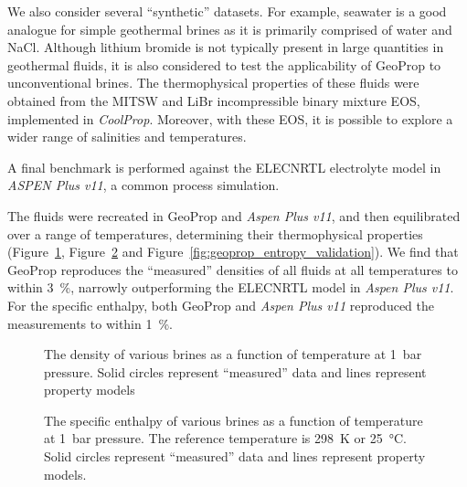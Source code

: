     We also consider several “synthetic” datasets. For example, seawater is a good analogue for simple geothermal brines as it is primarily comprised of water and NaCl. Although lithium bromide is not typically present in large quantities in geothermal fluids, it is also considered to test the applicability of GeoProp to unconventional brines. The thermophysical properties of these fluids were obtained from the MITSW and LiBr incompressible binary mixture \ac{EOS}, implemented in \emph{CoolProp}. Moreover, with these \ac{EOS}, it is possible to explore a wider range of salinities and temperatures.
    
    A final benchmark is performed against the ELECNRTL electrolyte model in \emph{ASPEN Plus v11}, a common process simulation. 
    
    The fluids were recreated in GeoProp and \emph{Aspen Plus v11}, and then equilibrated over a range of temperatures, determining their thermophysical properties (Figure~\ref{fig:geoprop_density_validation}, Figure~\ref{fig:geoprop_enthalpy_validation} and Figure~\ref{fig:geoprop_entropy_validation}). We find that GeoProp reproduces the “measured” densities of all fluids at all temperatures to within \qty{3}{\percent}, narrowly outperforming the ELECNRTL model in \emph{Aspen Plus v11}. For the specific enthalpy, both GeoProp and \emph{Aspen Plus v11} reproduced the measurements to within \qty{1}{\percent}.

    \begin{figure}[H]
        \centering
                
        \caption{The density of various brines as a function of temperature at \qty{1}{\bar} pressure. Solid circles represent “measured” data and lines represent property models}
        \label{fig:geoprop_density_validation}
    \end{figure}

    \begin{figure}[H]
        \centering
              
        \caption[The specific enthalpy of various brines as a function of temperature at \qty{1}{\bar} pressure.]{The specific enthalpy of various brines as a function of temperature at \qty{1}{\bar} pressure. The reference temperature is \qty{298}{\K} or \qty{25}{\degreeCelsius}. Solid circles represent “measured” data and lines represent property models.}
        \label{fig:geoprop_enthalpy_validation}
    \end{figure}

